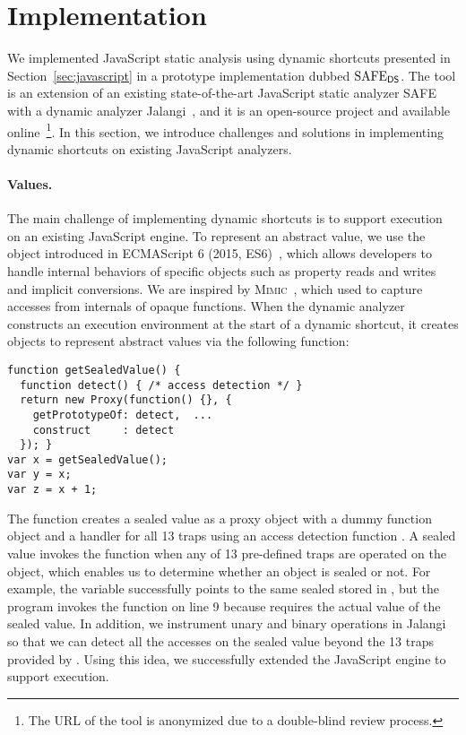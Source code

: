 \section{Implementation}\label{sec:implementation}
We implemented JavaScript static analysis using dynamic shortcuts
presented in Section~\ref{sec:javascript} in a prototype implementation dubbed
$\text{SAFE}_{\textsf{DS}}$.  The tool is an extension of an existing state-of-the-art JavaScript
static analyzer SAFE~\cite{safe, safe2} with a dynamic analyzer
Jalangi~\cite{jalangi}, and it is an open-source project and available online~\footnote{The
URL of the tool is anonymized due to a double-blind review process.}.  In this
section, we introduce challenges and solutions in implementing dynamic
shortcuts on existing JavaScript analyzers.

\paragraph{{\SealeD} Values.}
The main challenge of implementing dynamic shortcuts is to support {\sealed} execution on an existing JavaScript engine.  To represent an abstract
value, we use the  object introduced in ECMAScript 6
(2015, ES6)~\cite{es6}, which allows developers to handle internal behaviors
of specific objects such as property reads and writes and implicit conversions.
We are inspired by \textsc{Mimic}~\cite{mimic}, which used  to
capture accesses from internals of opaque functions.  When the dynamic analyzer
constructs an execution environment at the start of a dynamic shortcut, it
creates  objects to represent abstract values via the
following  function:
\begin{lstlisting}[style=myJSstyle]
function getSealedValue() {
  function detect() { /* access detection */ }
  return new Proxy(function() {}, {
    getPrototypeOf: detect,  ...
    construct     : detect
  }); }
var x = getSealedValue();
var y = x;
var z = x + 1;
\end{lstlisting}
The function creates a sealed value as a proxy object with a dummy
function object and a handler for all 13 traps using an access detection
function .  A sealed value invokes the function 
when any of 13 pre-defined traps are operated on the object, which enables us to
determine whether an object is sealed or not.  For example, the variable
 successfully points to the same sealed stored in , but the
program invokes the function  on line 9 because  requires
the actual value of the sealed value.  In addition, we instrument unary and binary
operations in Jalangi so that we can detect all the accesses on the
sealed value beyond the 13 traps provided by .
Using this idea, we successfully extended the
JavaScript engine to support {\sealed} execution.

